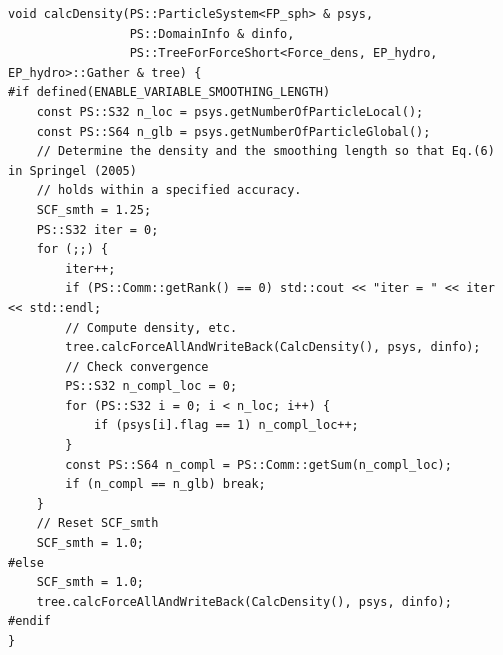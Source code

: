 \ifCpp %
\begin{lstlisting}[caption=関数\texttt{calcDensity}の実装]
void calcDensity(PS::ParticleSystem<FP_sph> & psys,
                 PS::DomainInfo & dinfo,
                 PS::TreeForForceShort<Force_dens, EP_hydro, EP_hydro>::Gather & tree) {
#if defined(ENABLE_VARIABLE_SMOOTHING_LENGTH)
    const PS::S32 n_loc = psys.getNumberOfParticleLocal();
    const PS::S64 n_glb = psys.getNumberOfParticleGlobal();
    // Determine the density and the smoothing length so that Eq.(6) in Springel (2005)
    // holds within a specified accuracy.
    SCF_smth = 1.25;
    PS::S32 iter = 0;
    for (;;) {
        iter++;
        if (PS::Comm::getRank() == 0) std::cout << "iter = " << iter << std::endl;
        // Compute density, etc.
        tree.calcForceAllAndWriteBack(CalcDensity(), psys, dinfo);
        // Check convergence
        PS::S32 n_compl_loc = 0;
        for (PS::S32 i = 0; i < n_loc; i++) {
            if (psys[i].flag == 1) n_compl_loc++;
        }
        const PS::S64 n_compl = PS::Comm::getSum(n_compl_loc);
        if (n_compl == n_glb) break;
    }
    // Reset SCF_smth
    SCF_smth = 1.0;
#else
    SCF_smth = 1.0;
    tree.calcForceAllAndWriteBack(CalcDensity(), psys, dinfo);
#endif
}
\end{lstlisting}
\endifCpp
\ifFtn %
